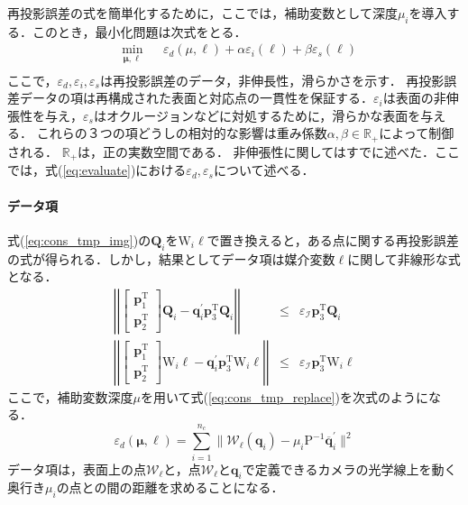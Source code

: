\documentclass[10.5pt,twocolumn,a4j,fleqn]{ujarticle}
\def\eqref#1{式(\ref{#1})}
\begin{document}
再投影誤差の式を簡単化するために，ここでは，補助変数として深度$\mu_i$を導入する．このとき，最小化問題は次式をとる．
\begin{equation}
    \begin{aligned}
        & \underset{\bm{\mu}, \bm{\ell}} {\text{min}} && \varepsilon_{d}(\mu, \bm{\ell}) + \alpha \varepsilon_i(\bm{\ell})+\beta\varepsilon_s(\bm{\ell})\\
    \end{aligned}
    \label{eq:evaluate}
\end{equation}
ここで，$\varepsilon_d,\varepsilon_i, \varepsilon_s$は再投影誤差のデータ，非伸長性，滑らかさを示す．
再投影誤差データの項は再構成された表面と対応点の一貫性を保証する．$\varepsilon_i$は表面の非伸張性を与え，$\varepsilon_s$はオクルージョンなどに対処するために，滑らかな表面を与える．
これらの３つの項どうしの相対的な影響は重み係数$\alpha, \beta \in \mathbb{R}_+$によって制御される．
$\mathbb{R}_+$は，正の実数空間である．
非伸張性に関してはすでに述べた．ここでは，\eqref{eq:evaluate}における$\varepsilon_d, \varepsilon_s$について述べる．

\paragraph{データ項}
\eqref{eq:cons_tmp_img}の$\bm{Q}_i$を$\mathrm{W}_i\bm{\ell}$で置き換えると，ある点に関する再投影誤差の式が得られる．しかし，結果としてデータ項は媒介変数$\bm{\ell}$に関して非線形な式となる．
\begin{eqnarray}
    \left|\left| 
    \left[
    \begin{array}{c}
      \mathrm{\bm{p}}_1^{\mathrm{T}}   \\
      \mathrm{\bm{p}}_2^{\mathrm{T}}
    \end{array}
  \right]\bm{Q}_i
 - \bm{q}_i^{\prime}\mathrm{\bm{p}}_3^{\mathrm{T}} \bm{Q}_i \right|\right|
 &\le& \varepsilon_{\mathcal{I}}\mathrm{\bm{p}}_3^{\mathrm{T}} \bm{Q}_i \nonumber\\
    \left|\left| 
    \left[
    \begin{array}{c}
      \mathrm{\bm{p}}_1^{\mathrm{T}}   \\
      \mathrm{\bm{p}}_2^{\mathrm{T}}
    \end{array}
  \right]\mathrm{W}_i\bm{\ell}
 - \bm{q}_i^{\prime}\mathrm{\bm{p}}_3^{\mathrm{T}} \mathrm{W}_i\bm{\ell} \right|\right|
 &\le& \varepsilon_{\mathcal{I}}\mathrm{\bm{p}}_3^{\mathrm{T}} \mathrm{W}_i\bm{\ell}
 \label{eq:cons_tmp_replace}
\end{eqnarray}
ここで，補助変数深度$\mu$を用いて\eqref{eq:cons_tmp_replace}を次式のようになる．
\begin{equation}
    \varepsilon_d(\bm{\mu},\bm{\ell}) = \sum_{i=1}^{n_c} \|\mathcal{W}_{\ell}(\mathrm{\bm{q}}_i) - \mu_i\mathrm{P}^{-1}\overline{\mathrm{\bm{q}}}_i^{\prime} \|^2
    \label{eq:3derror}
\end{equation}
データ項は，表面上の点$\mathcal{W}_{\ell}$と，点$\mathcal{W}_{\ell}$と$\mathrm{\bm{q}}_i$で定義できるカメラの光学線上を動く奥行き$\mu_i$の点との間の距離を求めることになる．
\end{document}
